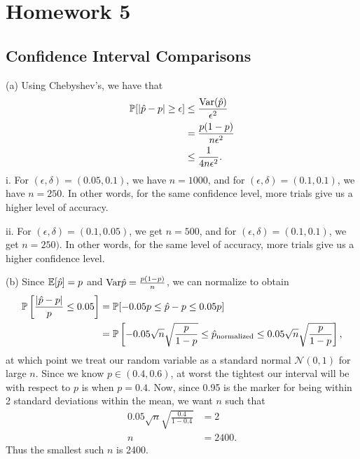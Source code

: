 

\section{Homework 5}
\subsection{Confidence Interval Comparisons}
(a) Using Chebyshev's, we have that
\begin{align*}
    \mathbb{P}[|\hat{p} - p| \geq \epsilon] &\leq \frac{\text{Var}(\hat{p})}{\epsilon^2} \\
    &= \frac{p(1 - p)}{n\epsilon^2} \\
    &\leq \frac{1}{4n\epsilon^2}.
\end{align*}
\quad i. For $(\epsilon, \delta) = (0.05, 0.1)$, we have $n = 1000$, and for $(\epsilon, \delta) = (0.1, 0.1)$, we have $n = 250$. In other words, for the same confidence level, more trials give us a higher level of accuracy.

\quad ii. For $(\epsilon ,\delta) = (0.1, 0.05)$, we get $n = 500$, and for $(\epsilon, \delta) = (0.1, 0.1)$, we get $n = 250)$. In other words, for the same level of accuracy, more trials give us a higher confidence level.

(b) Since $\mathbb{E}[\hat{p}] = p$ and $\text{Var}\hat{p} = \frac{p(1 - p)}{n}$, we can normalize to obtain
\begin{align*}
    \mathbb{P}\left[\frac{|\hat{p} - p|}{p} \leq 0.05\right] &= \mathbb{P}[-0.05p \leq \hat{p} - p \leq 0.05p] \\
    &= \mathbb{P}\left[-0.05\sqrt{n}\sqrt{\frac{p}{1-p}} \leq \hat{p}_{\text{normalized}} \leq 0.05\sqrt{n}\sqrt{\frac{p}{1-p}} \right],
\end{align*}
at which point we treat our random variable as a standard normal $\mathcal{N}(0, 1)$ for large $n$. Since we know $p \in (0.4, 0.6)$, at worst the tightest our interval will be with respect to $p$ is when $p = 0.4$. Now, since 0.95 is the marker for being within 2 standard deviations within the mean, we want $n$ such that
\begin{align*}
    0.05\sqrt{n}\sqrt{\frac{0.4}{1-0.4}} &= 2 \\
    n &= 2400.
\end{align*}
Thus the smallest such $n$ is 2400.

